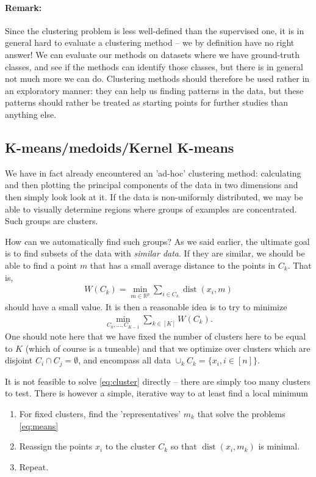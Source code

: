 \documentclass{article}
\newcommand{\R}{\mathbb{R}}
\DeclareMathOperator{\dist}{dist}
\begin{document}
\paragraph{Remark:} Since the clustering problem is less well-defined than the supervised one, it is in general hard to evaluate a clustering method -- we by definition have no right answer! We can evaluate our methods on datasets where we have ground-truth classes, and see if the methods can identify those classes, but there is in general not much more we can do. Clustering methods should therefore be used rather in an exploratory manner: they can help us finding patterns in the data, but these patterns should rather be treated as starting points for further studies than anything else. \newline

\subsection{K-means/medoids/Kernel K-means}
We have in fact already encountered an 'ad-hoc' clustering method: calculating and then plotting the principal components of the data in two dimensions and then simply look look at it. If the data is non-uniformly distributed, we may be able to visually determine regions where groups of examples are concentrated. Such groups are clusters. 

How can we automatically find such groups? As we said earlier, the ultimate goal is to find subsets of the data with \emph{similar data}. If they are similar, we should be able to find a point $m$ that has a small average distance to the points in $C_k$. That is,
\begin{align}
    W(C_k) = \min_{m\in \R^p} \sum_{i \in C_k} \dist(x_i,m) \label{eq:means}
\end{align}
should have a small value. It is then a reasonable idea is to try to minimize
\begin{align} \label{eq:cluster}
    \min_{C_0, \dots, C_{K-1}} \sum_{k \in [K]} W(C_k).
\end{align}
One should note here that we have fixed the number of clusters here to be equal to $K$ (which of course is a tuneable) and that we optimize over clusters which are disjoint $C_i \cap C_j=\emptyset$, and encompass all data $\cup_{k} C_k = \{x_i, i \in [n]\}$.

It is not feasible to solve \eqref{eq:cluster} directly -- there are simply too many clusters to test. There is however a simple, iterative way to at least find a local minimum
\begin{enumerate}
    \item For fixed clusters, find the 'representatives' $m_k$ that solve the problems \eqref{eq:means}
    \item Reassign the points $x_i$ to the cluster $C_k$ so that $\dist(x_i,m_k)$ is minimal.
    \item Repeat.
\end{enumerate}
\end{document}

